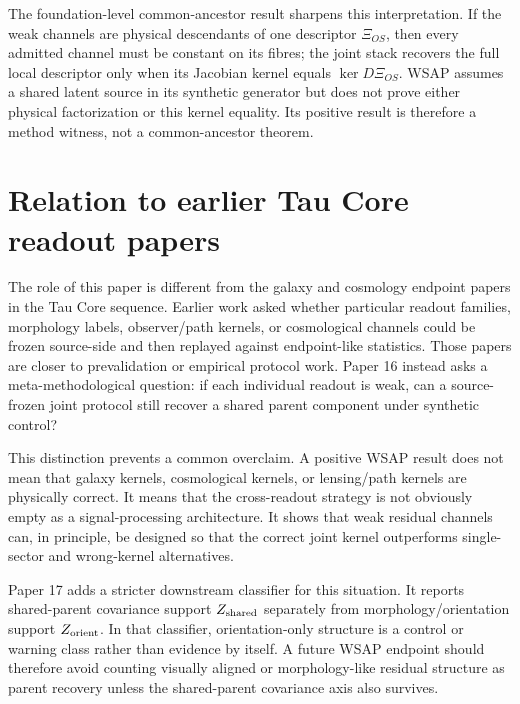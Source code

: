 \documentclass[12pt]{article}
\begin{document}
The foundation-level common-ancestor result sharpens this interpretation.  If
the weak channels are physical descendants of one descriptor \(\Xi_{OS}\),
then every admitted channel must be constant on its fibres; the joint stack
recovers the full local descriptor only when its Jacobian kernel equals
\(\ker D\Xi_{OS}\).  WSAP assumes a shared latent source in its synthetic
generator but does not prove either physical factorization or this kernel
equality.  Its positive result is therefore a method witness, not a
common-ancestor theorem.

\section{Relation to earlier Tau Core readout papers}

The role of this paper is different from the galaxy and cosmology endpoint
papers in the Tau Core sequence.  Earlier work asked whether particular
readout families, morphology labels, observer/path kernels, or cosmological
channels could be frozen source-side and then replayed against endpoint-like
statistics.  Those papers are closer to prevalidation or empirical protocol
work.  Paper 16 instead asks a meta-methodological question: if each individual
readout is weak, can a source-frozen joint protocol still recover a shared
parent component under synthetic control?

This distinction prevents a common overclaim.  A positive WSAP result does not
mean that galaxy kernels, cosmological kernels, or lensing/path kernels are
physically correct.  It means that the cross-readout strategy is not obviously
empty as a signal-processing architecture.  It shows that weak residual
channels can, in principle, be designed so that the correct joint kernel
outperforms single-sector and wrong-kernel alternatives.

Paper 17 adds a stricter downstream classifier for this situation.  It reports
shared-parent covariance support \(Z_{\rm shared}\) separately from
morphology/orientation support \(Z_{\rm orient}\).  In that classifier,
orientation-only structure is a control or warning class rather than evidence
by itself.  A future WSAP endpoint should therefore avoid counting visually
aligned or morphology-like residual structure as parent recovery unless the
shared-parent covariance axis also survives.
\end{document}
